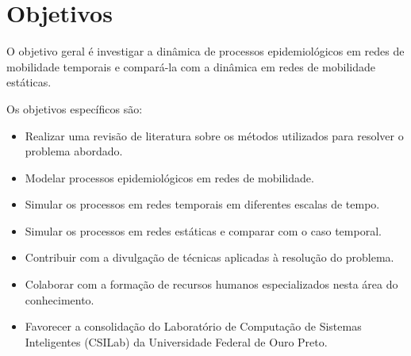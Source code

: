\chapter{Objetivos}

O objetivo geral é investigar a dinâmica de processos epidemiológicos em redes de mobilidade temporais e compará-la com a dinâmica em redes de mobilidade estáticas.

Os objetivos específicos são:

\begin{itemize}
    \item Realizar uma revisão de literatura sobre os métodos utilizados para resolver o problema
    abordado.
    \item Modelar processos epidemiológicos em redes de mobilidade.
    \item Simular os processos em redes temporais em diferentes escalas de tempo.
    \item Simular os processos em redes estáticas e comparar com o caso temporal.
    \item Contribuir com a divulgação de técnicas aplicadas à resolução do problema.
    \item Colaborar com a formação de recursos humanos especializados nesta área do
    conhecimento.
    \item Favorecer a consolidação do Laboratório de Computação de Sistemas Inteligentes
    (CSILab) da Universidade Federal de Ouro Preto.
\end{itemize}

